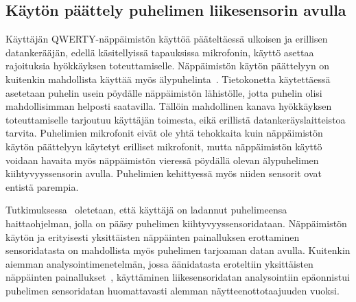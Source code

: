 \documentclass[finnish]{tktltiki2}
\theoremstyle{definition}
\theoremstyle{remark}
\begin{document}
\subsection{Käytön päättely puhelimen liikesensorin avulla}
Käyttäjän QWERTY-näppäimistön käyttöä pääteltäessä ulkoisen ja erillisen datankerääjän, edellä käsitellyissä tapauksissa mikrofonin, käyttö asettaa rajoituksia hyökkäyksen toteuttamiselle. Näppäimistön käytön päättelyyn on kuitenkin mahdollista käyttää myös älypuhelinta~\cite{mar}. Tietokonetta käytettäessä asetetaan puhelin usein pöydälle näppäimistön lähistölle, jotta puhelin olisi mahdollisimman helposti saatavilla. Tällöin mahdollinen kanava hyökkäyksen toteuttamiselle tarjoutuu käyttäjän toimesta, eikä erillistä datankeräyslaitteistoa tarvita. Puhelimien mikrofonit eivät ole yhtä tehokkaita kuin näppäimistön käytön päättelyyn käytetyt erilliset mikrofonit, mutta näppäimistön käyttö voidaan havaita myös näppäimistön vieressä pöydällä olevan älypuhelimen kiihtyvyyssensorin avulla. Puhelimien kehittyessä myös niiden sensorit ovat entistä parempia. 

Tutkimuksessa~\cite{mar} oletetaan, että käyttäjä on ladannut puhelimeensa haittaohjelman, jolla on pääsy puhelimen kiihtyvyyssensoridataan. Näppäimistön käytön ja erityisesti yksittäisten näppäinten painalluksen erottaminen sensoridatasta on mahdollista myös puhelimen tarjoaman datan avulla. Kuitenkin aiemman analysointimenetelmän, jossa äänidatasta eroteltiin yksittäisten näppäinten painallukset~\cite{aso}, käyttäminen liikesensoridatan analysointiin epäonnistui puhelimen sensoridatan huomattavasti alemman näytteenottotaajuuden vuoksi. 
\end{document}
